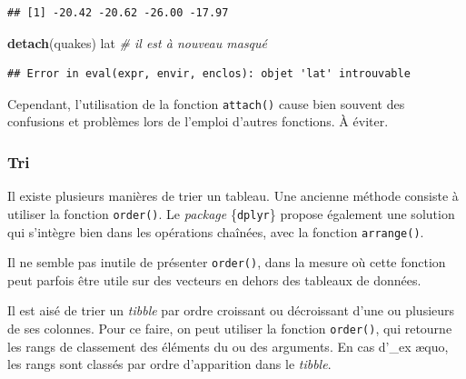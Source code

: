 \documentclass[
  11pt,
]{book}
\newenvironment{Shaded}{\begin{snugshade}}{\end{snugshade}}
\newcommand{\CommentTok}[1]{\textcolor[rgb]{0.56,0.35,0.01}{\textit{#1}}}
\newcommand{\DataTypeTok}[1]{\textcolor[rgb]{0.13,0.29,0.53}{#1}}
\newcommand{\DecValTok}[1]{\textcolor[rgb]{0.00,0.00,0.81}{#1}}
\newcommand{\KeywordTok}[1]{\textcolor[rgb]{0.13,0.29,0.53}{\textbf{#1}}}
\newcommand{\NormalTok}[1]{#1}
\newcommand{\OperatorTok}[1]{\textcolor[rgb]{0.81,0.36,0.00}{\textbf{#1}}}
\newcommand{\OtherTok}[1]{\textcolor[rgb]{0.56,0.35,0.01}{#1}}
\newcommand{\StringTok}[1]{\textcolor[rgb]{0.31,0.60,0.02}{#1}}
\numberwithin{equation}{section}
\numberwithin{countremarque}{section}
\begin{document}
\begin{lstlisting}
## [1] -20.42 -20.62 -26.00 -17.97
\end{lstlisting}

\begin{Shaded}
\begin{Highlighting}[]
\KeywordTok{detach}\NormalTok{(quakes)}
\NormalTok{lat }\CommentTok{\# il est à nouveau masqué}
\end{Highlighting}
\end{Shaded}

\begin{lstlisting}
## Error in eval(expr, envir, enclos): objet 'lat' introuvable
\end{lstlisting}

Cependant, l'utilisation de la fonction \texttt{attach()} cause bien souvent des confusions et problèmes lors de l'emploi d'autres fonctions. À éviter.

\hypertarget{tri}{%
\subsubsection{Tri}\label{tri}}

Il existe plusieurs manières de trier un tableau. Une ancienne méthode consiste à utiliser la fonction \texttt{order()}. Le \emph{package} \{\texttt{dplyr}\} propose également une solution qui s'intègre bien dans les opérations chaînées, avec la fonction \texttt{arrange()}.

Il ne semble pas inutile de présenter \texttt{order()}, dans la mesure où cette fonction peut parfois être utile sur des vecteurs en dehors des tableaux de données.

Il est aisé de trier un \emph{tibble} par ordre croissant ou décroissant d'une ou plusieurs de ses colonnes. Pour ce faire, on peut utiliser la fonction \texttt{order()}, qui retourne les rangs de classement des éléments du ou des arguments. En cas d'\_ex æquo, les rangs sont classés par ordre d'apparition dans le \emph{tibble}.

\begin{Shaded}
\end{Shaded}
\end{document}
